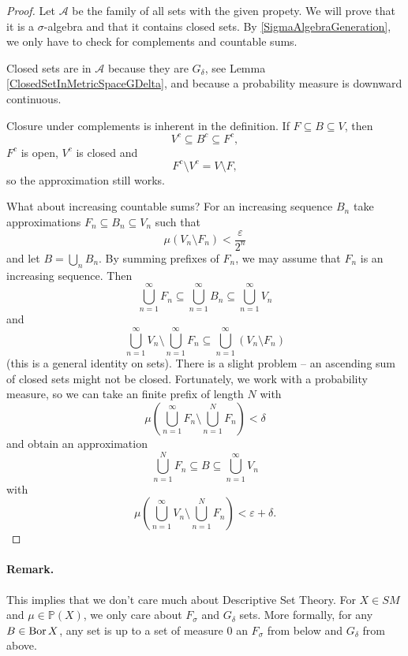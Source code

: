 \begin{proof}
    Let \( \mathcal{A} \) be the family of all sets with the given propety. We will prove that it is a \( \sigma \)-algebra and that it contains closed sets. By \ref{SigmaAlgebraGeneration}, we only have to check for complements and countable sums.

    Closed sets are in \( \mathcal{A} \) because they are \( G_\delta \), see Lemma \ref{ClosedSetInMetricSpaceGDelta}, and because a probability measure is downward continuous.

    Closure under complements is inherent in the definition. If \( F \subseteq B \subseteq V \), then 
    \[ 
      V^c \subseteq B^c \subseteq F^c,
   \]
   \( F^c \) is open, \( V^c \) is closed and
   \[ 
      F^c \setminus V^c = V \setminus F, 
  \]
  so the approximation still works.

What about increasing countable sums? For an increasing sequence \( B_n \) take approximations \( F_n \subseteq B_n \subseteq V_n \) such that
\[ 
    \mu \left( V_n \setminus F_n \right) < \frac{\varepsilon }{2^n}
\]
and let \( B = \bigcup_n B_n \). By summing prefixes of \( F_n \), we may assume that \( F_n \) is an increasing sequence. Then
\[ 
    \bigcup_{n=1}^\infty F_n \subseteq \bigcup_{n=1}^\infty B_n \subseteq \bigcup_{n=1}^\infty V_n
\]
and
\[ 
    \bigcup_{n=1}^\infty V_n \setminus \bigcup_{n=1}^\infty F_n \subseteq \bigcup_{n=1}^\infty (V_n \setminus F_n) 
\]
(this is a general identity on sets). There is a slight problem -- an ascending sum of closed sets might not be closed. Fortunately, we work with a probability measure, so we can take an finite prefix of length \( N \) with
\[ 
    \mu \left( \bigcup_{n=1}^\infty F_n \setminus \bigcup_{n=1}^N F_n \right) < \delta
\]
and obtain an approximation
\[ 
    \bigcup_{n=1}^N F_n \subseteq B \subseteq \bigcup_{n=1}^\infty V_n 
\]
with
\[ 
    \mu \left( \bigcup_{n=1}^\infty V_n \setminus \bigcup_{n=1}^N F_n \right) <\varepsilon + \delta. 
\]
\end{proof}


\paragraph{Remark.} This implies that we don't care much about Descriptive Set Theory. For \( X \in SM \) and \( \mu \in \mathbb{P}(X) \), we only care about \( F_\sigma \) and \( G_\delta \) sets. More formally, for any \( B \in \operatorname{Bor} X \), any set is up to a set of measure \( 0 \) an \( F_\sigma \) from below and \( G_\delta \) from above.

